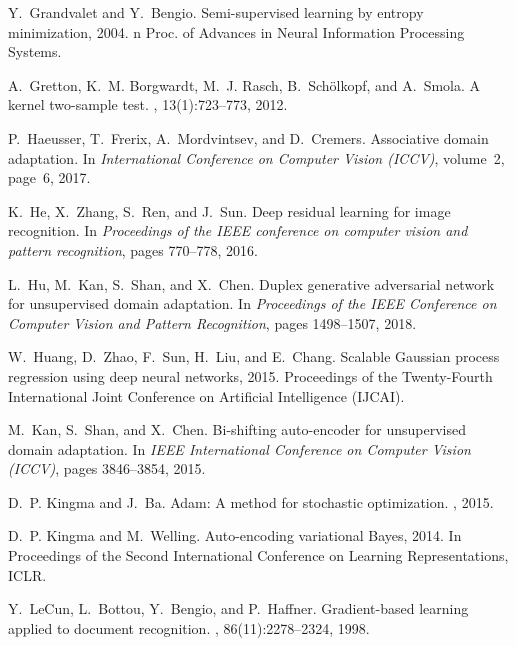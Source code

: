 \documentclass[10pt,letterpaper]{article}
\begin{document}
\begin{thebibliography}{10}
Y.~Grandvalet and Y.~Bengio.
\newblock Semi-supervised learning by entropy minimization, 2004.
n Proc. of Advances in Neural Information Processing Systems.

A.~Gretton, K.~M. Borgwardt, M.~J. Rasch, B.~Schölkopf, and A.~Smola.
\newblock A kernel two-sample test.
, 13(1):723--773, 2012.

P.~Haeusser, T.~Frerix, A.~Mordvintsev, and D.~Cremers.
\newblock Associative domain adaptation.
\newblock In {\em International Conference on Computer Vision (ICCV)},
  volume~2, page~6, 2017.

K.~He, X.~Zhang, S.~Ren, and J.~Sun.
\newblock Deep residual learning for image recognition.
\newblock In {\em Proceedings of the IEEE conference on computer vision and
  pattern recognition}, pages 770--778, 2016.

L.~Hu, M.~Kan, S.~Shan, and X.~Chen.
\newblock Duplex generative adversarial network for unsupervised domain
  adaptation.
\newblock In {\em Proceedings of the IEEE Conference on Computer Vision and
  Pattern Recognition}, pages 1498--1507, 2018.

W.~Huang, D.~Zhao, F.~Sun, H.~Liu, and E.~Chang.
\newblock Scalable {G}aussian process regression using deep neural networks,
  2015.
\newblock Proceedings of the Twenty-Fourth International Joint Conference on
  Artificial Intelligence (IJCAI).

M.~Kan, S.~Shan, and X.~Chen.
\newblock Bi-shifting auto-encoder for unsupervised domain adaptation.
\newblock In {\em IEEE International Conference on Computer Vision (ICCV)},
  pages 3846--3854, 2015.

D.~P. Kingma and J.~Ba.
\newblock Adam: A method for stochastic optimization.
,
  2015.

D.~P. Kingma and M.~Welling.
\newblock Auto-encoding variational {B}ayes, 2014.
\newblock In Proceedings of the Second International Conference on Learning
  Representations, ICLR.

Y.~LeCun, L.~Bottou, Y.~Bengio, and P.~Haffner.
\newblock Gradient-based learning applied to document recognition.
, 86(11):2278--2324, 1998.


\end{thebibliography}
\end{document}
